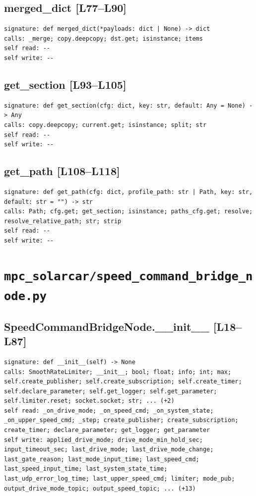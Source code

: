 \documentclass[a4paper,10pt,oneside]{book}
\begin{document}
\subsection*{merged\_dict [L77--L90]}
\begin{lstlisting}[numbers=none]
signature: def merged_dict(*payloads: dict | None) -> dict
calls: _merge; copy.deepcopy; dst.get; isinstance; items
self read: --
self write: --
\end{lstlisting}
\subsection*{get\_section [L93--L105]}
\begin{lstlisting}[numbers=none]
signature: def get_section(cfg: dict, key: str, default: Any = None) -> Any
calls: copy.deepcopy; current.get; isinstance; split; str
self read: --
self write: --
\end{lstlisting}
\subsection*{get\_path [L108--L118]}
\begin{lstlisting}[numbers=none]
signature: def get_path(cfg: dict, profile_path: str | Path, key: str, default: str = "") -> str
calls: Path; cfg.get; get_section; isinstance; paths_cfg.get; resolve; resolve_relative_path; str; strip
self read: --
self write: --
\end{lstlisting}
\section{\texttt{mpc\_solarcar/speed\_command\_bridge\_node.py}}
\subsection*{SpeedCommandBridgeNode.\_\_init\_\_ [L18--L87]}
\begin{lstlisting}[numbers=none]
signature: def __init__(self) -> None
calls: SmoothRateLimiter; __init__; bool; float; info; int; max; self.create_publisher; self.create_subscription; self.create_timer; self.declare_parameter; self.get_logger; self.get_parameter; self.limiter.reset; socket.socket; str; ... (+2)
self read: _on_drive_mode; _on_speed_cmd; _on_system_state; _on_upper_speed_cmd; _step; create_publisher; create_subscription; create_timer; declare_parameter; get_logger; get_parameter
self write: applied_drive_mode; drive_mode_min_hold_sec; input_timeout_sec; last_drive_mode; last_drive_mode_change; last_gate_reason; last_mode_input_time; last_speed_cmd; last_speed_input_time; last_system_state_time; last_udp_error_log_time; last_upper_speed_cmd; limiter; mode_pub; output_drive_mode_topic; output_speed_topic; ... (+13)
\end{lstlisting}
\end{document}
